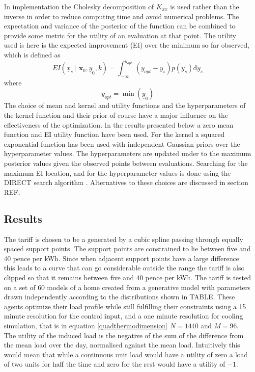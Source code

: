 \documentclass[a4paper, 10 pt, conference]{ieeeconf}  %
\begin{document}
In implementation the Cholesky decomposition of $K_{xx}$ is used rather than the inverse in order to reduce computing time and avoid numerical problems.
The expectation and variance of the posterior of the function can be combined to provide some metric for the utility of an evaluation at that point. The utility used is here is the expected improvement (EI) over the minimum so far observed, which is defined as
\begin{equation}
EI(\underline{x}_{s} \mid \mathbf{x}_0, \underline{y}_0, k)= \int_{-\infty  }^{y_{opt}} (y_{opt}-y_{s})p(y_{s}) \mathrm{d}y_{s}
\end{equation}
where
\begin{equation}
y_{opt} = \min(\underline{y}_{0})
\end{equation}
The choice of mean and kernel and utility functions and the hyperparameters of the kernel function and their prior of course have a major influence on the effectiveness of the optimization. In the results presented below a zero mean function and EI utility function have been used. For the kernel a squared exponential function has been used with independent Gaussian priors over the hyperparameter values. The hyperparameters are updated under to the maximum posterior values given the observed points between evaluations. Searching for the maximum EI location, and for the hyperparameter values is done using the DIRECT search algorithm \cite{jones1993lipschitzian}. Alternatives to these choices are discussed in section REF.
\subsection{Results}
The tariff is chosen to be a generated by a cubic spline passing through equally spaced support points. The support points are constrained to lie between five and 40 pence per kWh. Since when adjacent support points have a large difference this leads to a curve that can go considerable outside the range the tariff is also clipped so that it remains between five and 40 pence per kWh. The tariff is tested on a set of 60 models of a home created from a generative model with parameters drawn independently according to the distributions shown in TABLE. These agents optimize their load profile while still fulfilling their constraints using a 15 minute resolution for the control input, and a one minute resolution for cooling simulation, that is in equation \ref{quadthermodimension} $N=1440$ and $M=96$. The utility of the induced load is the negative of the sum of the difference from the mean load over the day, normalised against the mean load. Intuitively this would mean that while a continuous unit load would have a utility of zero a load of two units for half the time and zero for the rest would have a utility of $-1$.
\end{document}
